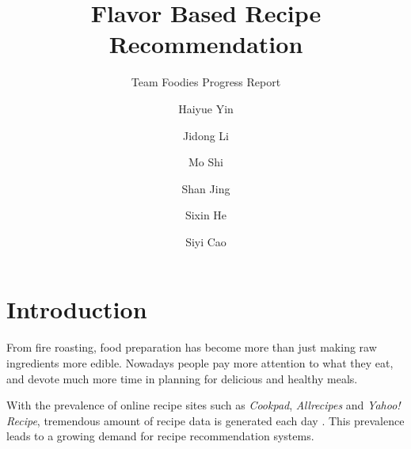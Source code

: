 \documentclass[sigconf]{acmart}
\begin{document}
\title{Flavor Based Recipe Recommendation}
\subtitle{Team Foodies Progress Report}

\author{Haiyue Yin}

\author{Jidong Li}

\author{Mo Shi}

\author{Shan Jing}

\author{Sixin He}

\author{Siyi Cao}




\maketitle

\section{Introduction}
\indent From fire roasting, food preparation has become more than just making raw ingredients more edible. Nowadays people pay more attention to what they eat, and devote much more time in planning for delicious and healthy meals\cite{lansing1920food}.

With the prevalence of online recipe sites such as \textit{Cookpad}, \textit{Allrecipes} and \textit{Yahoo! Recipe}, tremendous amount of recipe data is generated each day \cite{ueda2011user}. This prevalence leads to a growing demand for recipe recommendation systems. 
\end{document}
